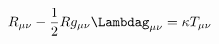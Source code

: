 \documentclass[preview]{standalone}
\begin{document}
\begin{align*}
R_{\mu \nu} - \frac{1}{2} Rg_{\mu \nu}\Lambdag_{\mu \nu}= \kappa T_{\mu \nu}
\end{align*}
\end{document}
